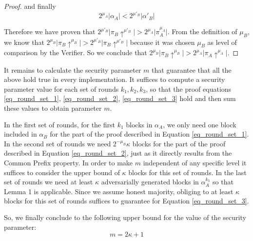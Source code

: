 \begin{proof}
	and finally
	\begin{equation}
	2^{\mu_A} \vert \alpha_A \vert < 2^{\mu'_B} \vert \alpha'{_B} \vert
	\end{equation}


	Therefore we have proven that $2^{\mu'_B} \vert \pi_B \uparrow^{\mu'_B} \vert >
	2^{\mu_A} \vert \pi_A^{\mu_A} \vert$. From the definition of $\mu_B$, we know
	that $2^{\mu_B} \vert \pi_B \uparrow^{\mu_B} \vert > 2^{\mu'_B} \vert \pi_B
	\uparrow^{\mu'_B} \vert$ because it was chosen $\mu_B$ as level of comparison
	by the Verifier. So we conclude that $2^{\mu_B} \vert \pi_B \uparrow^{\mu_B}
	\vert > 2^{\mu_A} \vert \pi_A \uparrow^{\mu_A} \vert$.

\end{proof}

It remains to calculate the security parameter $m$ that guarantee that all the above
hold true in every implementation. It suffices to compute a security parameter
value for each set of rounds $k_1, k_2, k_3$, so that the proof equations
\ref{eq_round_set_1}, \ref{eq_round_set_2}, \ref{eq_round_set_3} hold and
then sum these values to obtain parameter $m$.

In the first set of rounds, for the first $k_1$ blocks in $\alpha_A$, we only need
one block included in $\alpha_B$ for the part of the proof described in Equation
\ref{eq_round_set_1}. In the second set of rounds we need $2^{-\mu_B}\kappa$ blocks
for the part of the proof described in Equation \ref{eq_round_set_2}, just as it
directly results from the Common Prefix property. In order to make $m$ independent
of any specific level it suffices to consider the upper bound of $\kappa$ blocks
for this set of rounds. In the last set of rounds we need at least $\kappa$
adversarially generated blocks in $\alpha_A^{k_3}$ so that Lemma 1 is applicable.
Since we assume honest majority, obliging to at least $\kappa$ blocks for this
set of rounds suffices to guarantee for Equation \ref{eq_round_set_3}.

So, we finally conclude to the following upper bound for the value of the
security parameter:
\begin{equation}
	m = 2\kappa + 1
\end{equation}
